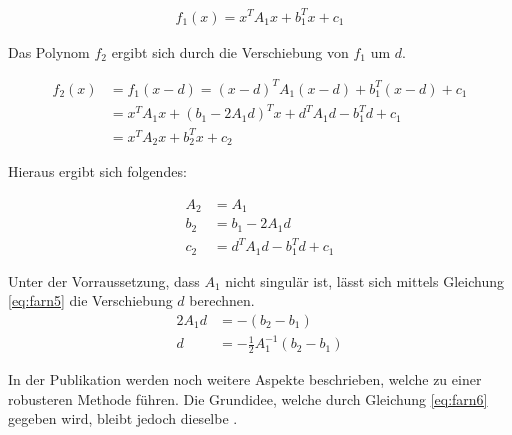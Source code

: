 \begin{subequations}
\begin{align*}
f_1(x) = x^T A_1 x + b_1^Tx + c_1
\end{align*}
\end{subequations}

Das Polynom $f_2$ ergibt sich durch die Verschiebung von $f_1$ um $d$.

\begin{subequations}
\begin{align}
f_2(x) &= f_1(x-d) =  (x-d)^T A_1 (x-d) + b_1^T(x-d) + c_1\\
       &= x^T A_1 x + (b_1 - 2A_1d)^Tx + d^TA_1d - b_1^T d + c_1\\
       &= x^T A_2 x + b_2^Tx + c_2
\end{align}
\end{subequations}

Hieraus ergibt sich folgendes:


\begin{subequations}
\begin{align}
    A_2 &= A_1 \\
    b_2 &= b_1 - 2A_1 d\\ \label{eq:farn5}
    c_2 &= d^T A_1d-b_1^Td+c_1
\end{align}
\end{subequations}

Unter der Vorraussetzung, dass $A_1$ nicht singulär ist, lässt sich mittels Gleichung \ref{eq:farn5} die Verschiebung $d$ berechnen.
\begin{subequations}
\begin{align}
    2A_1d &= -(b_2 -b_1) \\
    d &= -\frac{1}{2} A_1^{-1}(b_2 - b_1) \label{eq:farn6}
\end{align}
\end{subequations}

In der Publikation werden noch weitere Aspekte beschrieben, welche zu einer robusteren Methode führen.
Die Grundidee, welche durch Gleichung \ref{eq:farn6} gegeben wird, bleibt jedoch dieselbe \cite{10.1007/3-540-45103-X_50}.
